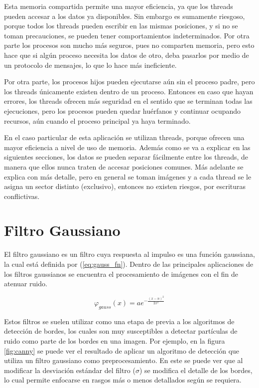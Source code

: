 \documentclass {article}
\begin{document}
Esta memoria compartida permite una mayor eficiencia, ya que los threads pueden
accesar a los datos ya disponibles. Sin embargo es sumamente riesgoso, porque todos los
threads pueden escribir en las mismas posiciones, y si no se toman precauciones, se pueden tener
comportamientos indeterminados. Por otra parte los procesos son mucho más seguros, pues no comparten
memoria, pero esto hace que si algún proceso necesita los datos de otro, deba pasarlos por medio de
un protocolo de mensajes, lo que lo hace más ineficiente.

Por otra parte, los procesos hijos pueden ejecutarse aún sin el proceso padre, pero los threads
únicamente existen dentro de un proceso. Entonces en caso que hayan errores, los threads ofrecen más
seguridad en el sentido que se terminan todas las ejecuciones, pero los procesos pueden quedar huérfanos y
continuar ocupando recursos, aún cuando el proceso principal ya haya terminado.

En el caso particular de esta aplicación se utilizan threads, porque ofrecen una mayor eficiencia a
nivel de uso de memoria. Además como se va a explicar en las siguientes secciones, los datos se
pueden separar fácilmente entre los threads, de manera que ellos nunca traten de accesar posiciones
comunes. Más adelante se explica con más detalle, pero en general se toman imágenes y a cada thread
se le asigna un sector distinto (exclusivo), entonces no existen riesgos, por escrituras
conflictivas. 


\section{Filtro Gaussiano}

El filtro gaussiano es un filtro cuya respuesta al impulso es una función gaussiana, la cual está
definida por (\ref{eq:gauss_fn}). Dentro de las principales aplicaciones de los filtros gaussianos
se encuentra el procesamiento de imágenes con el fin de atenuar ruido. 

\begin{equation}
  \varphi_{gauss}(x)=ae^{-\frac{(x-n)^2}{2x^2}}
  \label{eq:gauss_fn}
\end{equation}

Estos filtros se suelen utilizar como una etapa de previa a los algoritmos de detección de bordes,
los cuales son muy susceptibles a detectar partículas de ruido como parte de los bordes en una
imagen. Por ejemplo, en la figura \ref{fig:canny} se puede ver el resultado de aplicar un algoritmo
de detección que utiliza un filtro gaussiano como preprocesamiento. En este se puede ver que al
modificar la desviación estándar del filtro ($\sigma$) se modifica el detalle de los bordes, lo cual
permite enfocarse en rasgos más o menos detallados según se requiera.
\end{document}
